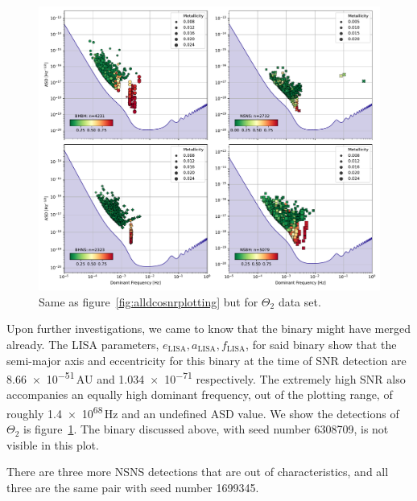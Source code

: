 \documentclass[journal, twocolumns]{IEEEtran}
\newcommand{\semaxis}[1]{a_{\text{#1}}}
\newcommand{\ecc}[1]{e_\text{#1}}
\begin{document}
    \begin{figure}[!h]%
        \centering
        \includegraphics[width=\columnwidth]{analysis_data/004__images_for_latex/dco_typewise_snr0e}
        \caption{Same as figure~\ref{fig:alldcosnrplotting} but for $\Theta_2$ data set.}
        \label{fig:dcotypewisesnr0e}
    \end{figure}%

    Upon further investigations, we came to know that the binary might have merged already.
    The LISA parameters, $\ecc{LISA}, \semaxis{LISA}, f_\text{LISA}$, for said binary show that the semi-major axis and eccentricity for this binary at the time of SNR detection are \num[scientific-notation=engineering]{8.66e-51}\,AU and \num[scientific-notation=engineering]{1.034e-71} respectively.
    The extremely high SNR also accompanies an equally high dominant frequency, out of the plotting range, of roughly \num{1.4e68}\,\si{\hertz} and an undefined ASD value.
    We show the detections of $\Theta_2$ is figure~\ref{fig:dcotypewisesnr0e}.
    The binary discussed above, with seed number 6308709, is not visible in this plot.

    There are three more NSNS detections that are out of characteristics, and all three are the same pair with seed number 1699345.
\end{document}
